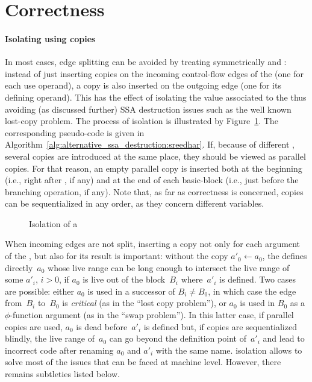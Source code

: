 \section{Correctness}

\paragraph{Isolating \phinode using copies}
In most cases, edge splitting can be avoided by treating symmetrically \phiuses and \phidef: instead of just inserting copies on the incoming control-flow edges of the \phinode (one for each use operand), a copy is also inserted on the outgoing edge (one for its defining operand). This has the effect of isolating the value associated to the \phinode thus avoiding (as discussed further) SSA destruction issues such as the well known lost-copy problem.
The process of \phinode isolation is illustrated by Figure~\ref{fig:phi_isolation}.
The corresponding pseudo-code is given in Algorithm~\ref{alg:alternative_ssa_destruction:sreedhar}. If, because of different \phifuns, several copies are introduced at the
same place, they should be viewed as parallel copies. For that reason, an empty parallel copy is inserted both at the beginning (i.e., right after \phifuns, if any) and at the end of each basic-block (i.e., just before the branching operation, if any).  
Note that, as far as correctness is concerned, copies
can be sequentialized in any order, as they concern different
variables. 

\begin{figure}[h]
  \hfill
{}\hfill
{}
\hfill\strut
\caption{Isolation of a \phinode\label{fig:phi_isolation}}
\end{figure}


When incoming edges are not split, inserting a copy not only for each argument of the \phifun, but also for its result is important: without the copy $a'_0\gets a_0$, the \phifun defines
directly~$a_0$ whose live range can be long enough to intersect the live range
of some $a'_i$, $i>0$, if $a_0$ is live out of the block~$B_i$ where~$a'_i$ is
defined. Two cases are possible: either $a_0$ is used in a successor of $B_i
\neq B_0$, in which case the edge from~$B_i$ to~$B_0$ is \emph{critical} (as in
the ``lost copy problem''), or $a_0$ is used in $B_0$ as a $\phi$-function
argument (as in the ``swap problem''). In this latter case, if parallel copies
are used, $a_0$ is dead before~$a'_i$ is defined but, if copies are
sequentialized blindly, the live range of~$a_0$ can go beyond the definition
point of~$a'_i$ and lead to incorrect code after renaming $a_0$ and $a'_i$ with
the same name. \phinode isolation allows to solve most of the issues that can be faced at machine level. However, there remains subtleties listed below.




